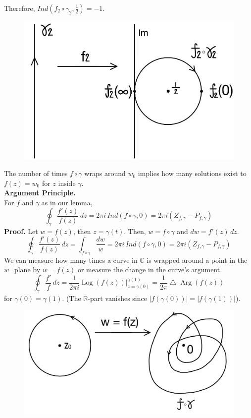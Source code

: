 \documentclass[11pt]{article}
\begin{document}
Therefore, $Ind( f_2 \circ \gamma_2, \frac{1}{2}) = -1$. 
\begin{figure}[H]
\includegraphics[scale = 0.17]{22_6}
\centering
\end{figure}
The number of times $f \circ \gamma$ wraps around $w_0$ implies how many solutions exist to $f(z) = w_0$ for $z$ inside $\gamma$. \\
\newline
\textbf{Argument Principle. } \\
For $f$ and $\gamma$ as in our lemma, 
$$ \oint_{\gamma}\frac{f'(z)}{f(z)} \,dz = 2\pi i \, Ind(f\circ \gamma, 0) = 2\pi i(Z_{f, \gamma} - P_{f, \gamma})$$
\textbf{Proof.} Let $w = f(z)$, then $z = \gamma(t)$. Then, $w = f \circ \gamma$ and $dw = f'(z) \, dz$. 
$$ \oint_\gamma \frac{f'(z)}{f(z)} \,dz = \int_{f\circ \gamma}\frac{dw}{w} = 2\pi i\, Ind(f\circ \gamma, 0) = 2\pi i(Z_{f, \gamma} - P_{f, \gamma}) $$
We can measure how many times a curve in $\mathbb{C}$ is wrapped around a point in the $w$=plane by $w = f(z)$ or measure the change in the curve's argument. 
$$ \oint_{\gamma}\frac{f'}{f}\,dz = \frac{1}{2\pi i} \operatorname{Log}\left(f(z)\right)\Bigg\rvert_{z = \gamma(0)}^{\gamma(1)} = \frac{1}{2\pi} \bigtriangleup \operatorname{Arg}\left(f(z)\right)$$
for $\gamma(0) = \gamma(1)$. (The $\mathbb{R}$-part vanishes since $|f(\gamma(0))| = |f(\gamma(1))|$). \\
\begin{figure}[H]
\includegraphics[scale = 0.17]{22_7}
\centering
\end{figure}
\end{document}
